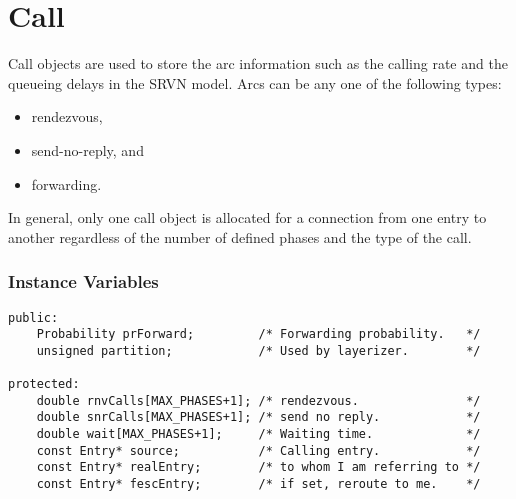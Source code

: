 % 
% 
\section{Call}
\label{sec:call}

Call objects are used to store the arc information such as the calling
rate and the queueing delays in the SRVN model.  Arcs can be any one
of the following types:
\begin{itemize}
\item rendezvous,
\item send-no-reply, and
\item forwarding.
\end{itemize}
In general, only one call object is allocated for a connection from
one entry to another regardless of the number of defined phases and
the type of the call.

\subsubsection{Instance Variables}
\label{sec:call-ivars}
\begin{verbatim}
public:
    Probability prForward;         /* Forwarding probability.   */
    unsigned partition;            /* Used by layerizer.        */
    
protected:
    double rnvCalls[MAX_PHASES+1]; /* rendezvous.               */
    double snrCalls[MAX_PHASES+1]; /* send no reply.            */
    double wait[MAX_PHASES+1];     /* Waiting time.             */
    const Entry* source;           /* Calling entry.            */
    const Entry* realEntry;        /* to whom I am referring to */
    const Entry* fescEntry;        /* if set, reroute to me.    */
\end{verbatim}

